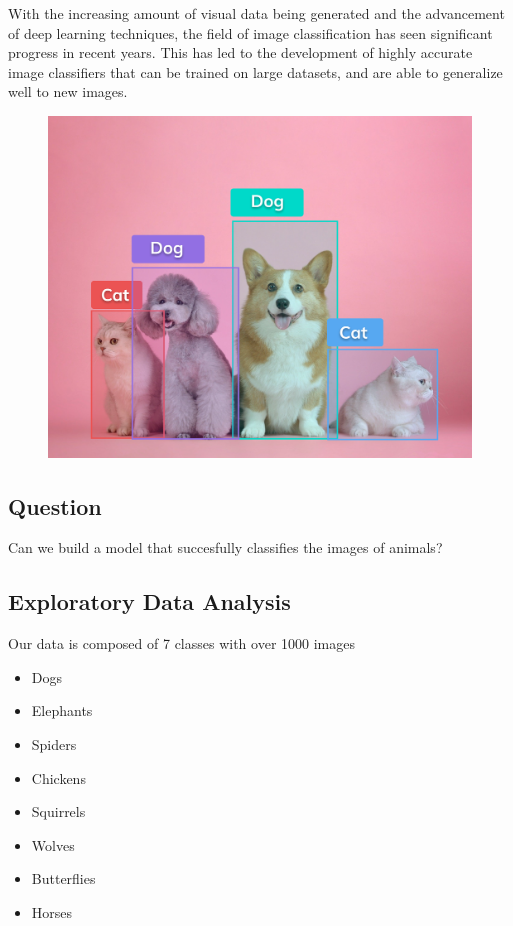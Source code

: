 \documentclass[
  letterpaper,
  DIV=11,
  numbers=noendperiod]{scrartcl}
\providecommand{\tightlist}{%
  \setlength{\itemsep}{0pt}\setlength{\parskip}{0pt}}\usepackage{longtable,booktabs,array}
\begin{document}
With the increasing amount of visual data being generated and the
advancement of deep learning techniques, the field of image
classification has seen significant progress in recent years. This has
led to the development of highly accurate image classifiers that can be
trained on large datasets, and are able to generalize well to new
images.

\begin{figure}

{\centering \includegraphics{animals.png}

}

\end{figure}

\hypertarget{question}{%
\subsection{Question}\label{question}}

Can we build a model that succesfully classifies the images of animals?

\hypertarget{exploratory-data-analysis}{%
\subsection{Exploratory Data Analysis}\label{exploratory-data-analysis}}

Our data is composed of 7 classes with over 1000 images

\begin{itemize}
\tightlist
\item
  Dogs
\item
  Elephants
\item
  Spiders
\item
  Chickens
\item
  Squirrels
\item
  Wolves
\item
  Butterflies
\item
  Horses
\end{itemize}
\end{document}
